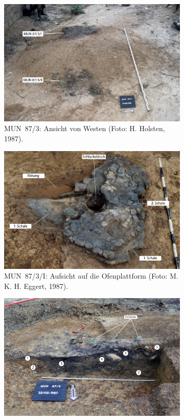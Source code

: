 \begin{figure}[p]
	\centering
	\begin{subfigure}[t]{\columnwidth}
		\includegraphics[width=\textwidth]{fig/MUN87-30_H87-03-18-01.pdf}
		\caption{MUN~87/3: Ansicht von Westen (Foto: H. Holsten, 1987).}
		\label{fig:MUN87.3-0_Foto}
	\end{subfigure}\hfill
	\begin{subfigure}[t]{\columnwidth}
		\includegraphics[width=\textwidth]{fig/MUN87-3-I_E-87-038-34_kompr.pdf}
		\caption{MUN~87/3/I: Aufsicht auf die Ofenplattform (Foto: M. K. H. Eggert, 1987).}
		\label{fig:MUN87-3_Planum}
	\end{subfigure}
	\begin{subfigure}[t]{\columnwidth}
		\includegraphics[width=\textwidth]{fig/MUN87-3-II-4_H87-04-37.pdf}

\end{subfigure}
\end{figure}

